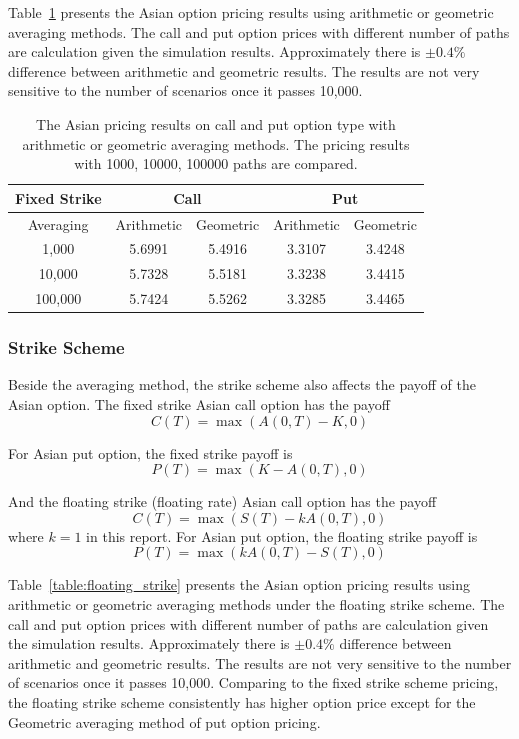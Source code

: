 \documentclass[a4paper,11pt] {article}
\begin{document}
Table~\ref{table:fixed_strike} presents the Asian option pricing results using arithmetic or geometric averaging methods. The call and put option prices with different number of paths are calculation given the simulation results. Approximately there is $\pm 0.4 \%$ difference between arithmetic and geometric results. The results are not very sensitive to the number of scenarios once it passes 10,000.

\begin{table}[htb]
\begin{center}
\begin{tabular}{c||c|c|c|c}
  \hline
  Fixed Strike & \multicolumn{2}{c|}{Call} & \multicolumn{2}{c}{Put} \\ \hline
  Averaging & Arithmetic & Geometric & Arithmetic & Geometric \\ \hline
  1,000 & 5.6991 & 5.4916 & 3.3107 & 3.4248 \\
  10,000 & 5.7328 & 5.5181 & 3.3238 & 3.4415 \\
  100,000 & 5.7424 & 5.5262 & 3.3285 & 3.4465 \\
  \hline
\end{tabular}
\caption{The Asian pricing results on call and put option type with arithmetic or geometric averaging methods. The pricing results with 1000, 10000, 100000 paths are compared.}
\label{table:fixed_strike}
\end{center}
\end{table}


\subsubsection{Strike Scheme}
Beside the averaging method, the strike scheme also affects the payoff of the Asian option. The fixed strike Asian call option has the payoff
$$
C(T) = \max(A(0,T)-K,0)
$$

For Asian put option, the fixed strike payoff is
$$
P(T) = \max(K-A(0,T),0)
$$

And the floating strike (floating rate) Asian call option has the payoff
$$
C(T) = \max(S(T)-kA(0,T),0)
$$
where $k=1$ in this report. For Asian put option, the floating strike payoff is
$$
P(T) = \max(kA(0,T)-S(T),0)
$$

Table~\ref{table:floating_strike} presents the Asian option pricing results using arithmetic or geometric averaging methods under the floating strike scheme. The call and put option prices with different number of paths are calculation given the simulation results. Approximately there is $\pm 0.4 \%$ difference between arithmetic and geometric results. The results are not very sensitive to the number of scenarios once it passes 10,000. Comparing to the fixed strike scheme pricing, the floating strike scheme consistently has higher option price except for the Geometric averaging method of put option pricing.
\end{document}
